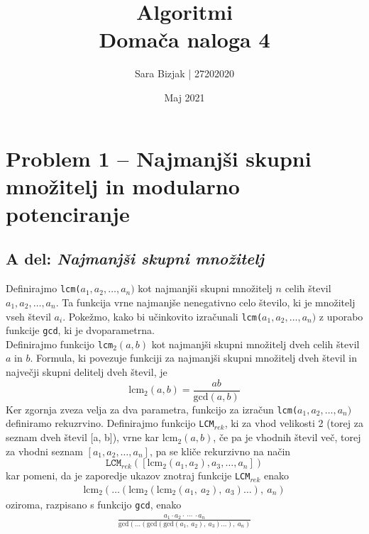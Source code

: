 \documentclass[a4paper,11pt]{article}
\title{Algoritmi \\
\textbf{Domača naloga 4} }
\author{Sara Bizjak  |  27202020}
\date{Maj 2021}
\begin{document}
\maketitle


\section*{Problem 1 -- Najmanjši skupni množitelj in modularno potenciranje}

\subsection*{A del: \textit{Najmanjši skupni množitelj}}

Definirajmo \texttt{lcm($a_1, a_2, \ldots, a_n)$} kot najmanjši skupni množitelj $n$ celih števil $a_1, a_2, \ldots, a_n$. Ta funkcija vrne najmanjše nenegativno celo število, ki je množitelj vseh števil $a_i$. 
Pokežmo, kako bi učinkovito izračunali  \texttt{lcm($a_1, a_2, \ldots, a_n)$}  z uporabo funkcije \texttt{gcd}, ki je dvoparametrna.
\\
Definirajmo funkcijo \texttt{lcm$_2(a, b)$} kot najmanjši skupni množitelj dveh celih števil $a$ in $b$.
Formula, ki povezuje funkciji za najmanjši skupni množitelj dveh števil in največji skupni delitelj dveh števil, je
$$
\text{lcm}_2(a, b) = \frac{ab}{\text{gcd}(a, b)}
$$
Ker zgornja zveza velja za dva parametra, funkcijo za izračun \texttt{lcm($a_1, a_2, \ldots, a_n)$} definiramo rekuzrvino. 
Definirajmo funkcijo \texttt{LCM$_{rek}$}, ki za vhod velikosti 2 (torej za seznam dveh števil [a, b]), vrne kar $\text{lcm}_2(a, b)$, če pa je vhodnih števil več, torej za vhodni seznam $[a_1, a_2, \ldots, a_n]$, pa se kliče rekurzivno na način
$$
\texttt{LCM$_{rek}$}([\text{lcm}_2(a_1, a_2), a_3, \ldots, a_n])
$$
kar pomeni, da je zaporedje ukazov znotraj funkcije \texttt{LCM$_{rek}$} enako
\begin{align*} 
\text{lcm}_2( \ldots (\text{lcm}_2(\text{lcm}_2(a_1, \ a_2), \ a_3) \ldots), \ a_n)
\end{align*}
oziroma, razpisano s funkcijo \texttt{gcd}, enako
\begin{align*}
\frac{a_1 \cdot a_2 \cdot \ \cdots \ \cdot a_n}{\text{gcd}( \ldots (\text{gcd}(\text{gcd}(a_1, \ a_2), \ a_3) \ldots), \ a_n)}
\end{align*}
\end{document}
